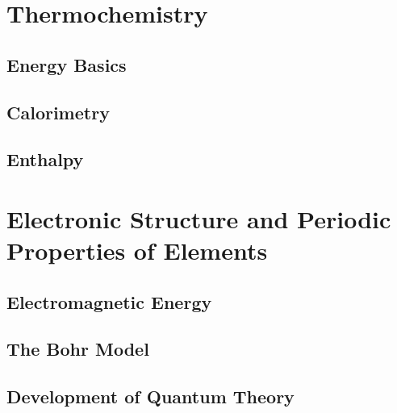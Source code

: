 \documentclass[12pt, openany, letterpaper]{memoir}
\begin{document}
\chapter{Thermochemistry}

\section{Energy Basics}

\section{Calorimetry}

\section{Enthalpy}

\chapter{Electronic Structure and Periodic Properties of Elements}

\section{Electromagnetic Energy}

\section{The Bohr Model}

\section{Development of Quantum Theory}
\end{document}
